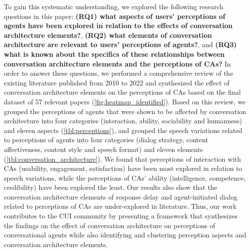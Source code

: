 To gain this systematic understanding, we explored the following research questions in this paper: \textbf{(RQ1) what aspects of users' perceptions of agents have been explored in relation to the effects of conversation architecture elements?}, \textbf{(RQ2) what elements of conversation architecture are relevant to users' perceptions of agents?}, and \textbf{(RQ3) what is known about the specifics of these relationships between conversation architecture elements and the perceptions of CAs?}
In order to answer these questions, we performed a comprehensive review of the existing literature published from 2010 to 2022 and synthesized the effect of conversation architecture elements on the perceptions of CAs based on the final dataset of 57 relevant papers (\autoref{fig:heatmap_identified}). Based on this review, we grouped the perceptions of agents that were shown to be affected by conversation architecture into four categories (interaction, ability, sociability and humanness) and eleven aspects (\autoref{tbl:perceptions}), and grouped the speech variations related to perceptions of agents into four categories (dialog strategy, content affectiveness, content style and speech format) and eleven elements (\autoref{tbl:conversation_architecture}). 
We found that perceptions of interaction with CAs (usability, engagement, satisfaction) have been most explored in relation to speech variations, while the perceptions of CAs' ability (intelligence, competence, credibility) have been explored the least.
Our results also show that the conversation architecture elements of response delay and agent-initiated dialog related to perceptions of CAs are under-explored in literature. 
Thus, our work contributes to the CUI community by presenting a framework that synthesizes the findings on the effect of conversation architecture on perceptions of conversational agents while also identifying and clustering perception aspects and conversation architecture elements. %

